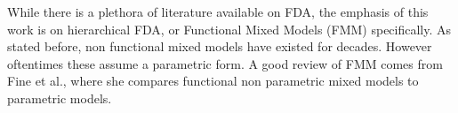 While there is a plethora of literature available on  FDA, the emphasis of this work is on hierarchical FDA, 
or Functional Mixed Models (FMM) specifically.  
As stated before, non functional mixed models have existed for decades.  
However oftentimes these assume a parametric form.  
A good review of FMM comes from Fine et al., where she compares functional
 non parametric mixed models to parametric models\cite{fine_examination_2019}.